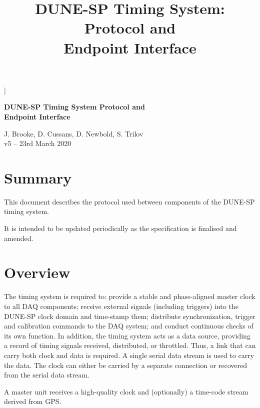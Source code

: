 \documentclass[a4paper,11pt]{article}
\begin{document}

\lstMakeShortInline[columns=fixed]|

\title{DUNE-SP Timing System: Protocol and\\ Endpoint Interface}
\begin{center}
{\LARGE\bf DUNE-SP Timing System Protocol and\\ Endpoint Interface}
\vspace{1cm}

J. Brooke, D. Cussans, D. Newbold, S. Trilov \\
\vspace*{1ex}
v5 -- 23rd March 2020
\end{center}
\vspace*{\fill}
\setcounter{tocdepth}{1}
\tableofcontents
\vspace*{\fill}

\section*{Summary}

This document describes the protocol used between components of the DUNE-SP timing system. 

It is intended to be updated periodically as the specification is finalised and amended.

\newpage
\section{Overview}

The timing system is required to: provide a stable and phase-aligned
master clock to all DAQ components; receive external signals (including triggers)
into the DUNE-SP clock domain and time-stamp them; distribute synchronization,
trigger and calibration commands to the DAQ system; and conduct continuous
checks of its own function. In addition, the timing system acts as a
data source, providing a record of timing signals received, distributed, or
throttled. Thus, a link that can carry both clock and data is required. A single serial data stream is used to carry the data. The clock can either be carried by a separate connection or recovered from the serial data stream.

A master unit receives a high-quality clock and (optionally) a time-code stream derived from GPS. 
\end{document}
